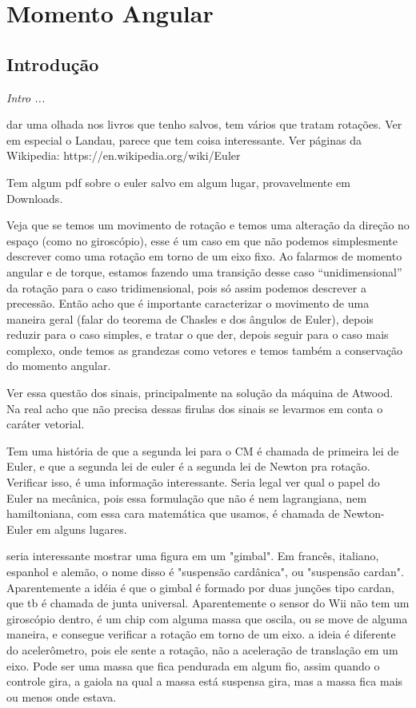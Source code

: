 \chapter{Momento Angular}
\label{Chap:MomentoAngular}

\section{Introdução}

{\it
Intro ...

dar uma olhada nos livros que tenho salvos, tem vários que tratam rotações. Ver em especial o Landau, parece que tem coisa interessante. Ver páginas da Wikipedia: https://en.wikipedia.org/wiki/Euler%

Tem algum pdf sobre o euler salvo em algum lugar, provavelmente em Downloads.
}

Veja que se temos um movimento de rotação e temos uma alteração da direção no espaço (como no giroscópio), esse é um caso em que não podemos simplesmente descrever como uma rotação em torno de um eixo fixo. Ao falarmos de momento angular e de torque, estamos fazendo uma transição desse caso ``unidimensional'' da rotação para o caso tridimensional, pois só assim podemos descrever a precessão. Então acho que é importante caracterizar o movimento de uma maneira geral (falar do teorema de Chasles e dos ângulos de Euler), depois reduzir para o caso simples, e tratar o que der, depois seguir para o caso mais complexo, onde temos as grandezas como vetores e temos também a conservação do momento angular.


Ver essa questão dos sinais, principalmente na solução da máquina de Atwood. Na real acho que não precisa dessas firulas dos sinais se levarmos em conta o caráter vetorial.

Tem uma história de que a segunda lei para o CM é chamada de primeira lei de Euler, e que a segunda lei de euler é a segunda lei de Newton pra rotação. Verificar isso, é uma informação interessante. Seria legal ver qual o papel do Euler na mecânica, pois essa formulação que não é nem lagrangiana, nem hamiltoniana, com essa cara matemática que usamos, é chamada de Newton-Euler em alguns lugares.

seria interessante mostrar uma figura em um "gimbal". Em francês, italiano, espanhol e alemão, o nome disso é "suspensão cardânica", ou "suspensão cardan". Aparentemente a idéia é que o gimbal é formado por duas junções tipo cardan, que tb é chamada de junta universal. Aparentemente o sensor do Wii não tem um giroscópio dentro, é um chip com alguma massa que oscila, ou se move de alguma maneira, e consegue verificar a rotação em torno de um eixo. a ideia é diferente do acelerômetro, pois ele sente a rotação, não a aceleração de translação em um eixo. Pode ser uma massa que fica pendurada em algum fio, assim quando o controle gira, a gaiola na qual a massa está suspensa gira, mas a massa fica mais ou menos onde estava.

